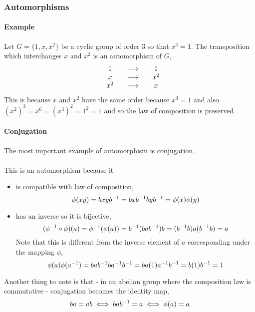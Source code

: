 \documentclass[MathsNotesBase.tex]{subfiles}
\begin{document}
{		\subsubsection{Automorphisms}
		\paragraph{Example}
		Let $G = \{1, x, x^2\}$ be a cyclic group of order 3 so that $x^3 = 1$. The transposition which interchanges $x$ and $x^2$ is an automorphism of $G$,
		\[\begin{array}{*6c}
			&1 &&\longmapsto &&1 \\
			&x &&\longmapsto &&x^2 \\
			&x^2 &&\longmapsto &&x \\
		\end{array}\]
		This is because $x$ and $x^2$ have the same order because $x^3 = 1$ and also $(x^2)^3 = x^6 = (x^3)^2 = 1^2 = 1$ and so the law of composition is preserved.
		\paragraph{Conjugation}
		The most important example of automorphism is conjugation.\\\\
		This is an automorphism because it
		\begin{itemize}
			\item{is compatible with law of composition, 
				\[ \phi(xy) = bxy{b}^{-1} = bx{b}^{-1}by{b}^{-1} = \phi(x)\phi(y) \]
			}
			\item{has an inverse so it is bijective, 
				\[ ({\phi}^{-1} \circ \phi)(a) = {\phi}^{-1}(\phi(a)) = {b}^{-1}(ba{b}^{-1})b = ({b}^{-1}b)a({b}^{-1}b) = a \]
				Note that this is different from the inverse element of $a$ corresponding under the mapping $\phi$,
				\[ \phi(a)\phi({a}^{-1}) = ba{b}^{-1}b{a}^{-1}{b}^{-1} = ba(1){a}^{-1}{b}^{-1} = b(1){b}^{-1} = 1 \]
			}
		\end{itemize}
		Another thing to note is that - in an abelian group where the composition law is commutative - conjugation becomes the identity map,
		\[ ba = ab \iff ba{b}^{-1} = a \iff \phi(a) = a \]
	}
\end{document}
